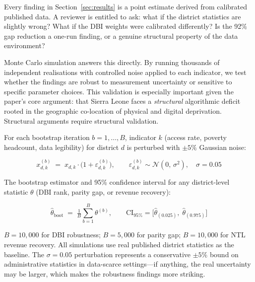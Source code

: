 \documentclass[preprint,12pt]{elsarticle}
\begin{document}
Every finding in Section~\ref{sec:results} is a point estimate
derived from calibrated published data. A reviewer is entitled
to ask: what if the district statistics are slightly wrong?
What if the DBI weights were calibrated differently? Is the
92\% gap reduction a one-run finding, or a genuine structural
property of the data environment?

Monte Carlo simulation answers this directly. By running
thousands of independent realisations with controlled noise
applied to each indicator, we test whether the findings are
robust to measurement uncertainty or sensitive to specific
parameter choices. This validation is especially important
given the paper's core argument: that Sierra Leone faces a
\textit{structural} algorithmic deficit rooted in the
geographic co-location of physical and digital deprivation.
Structural arguments require structural validation.

\begin{tcolorbox}[metMC,
  title={Monte Carlo Bootstrap Estimator}]

For each bootstrap iteration $b = 1, \ldots, B$, indicator
$k$ (access rate, poverty headcount, data legibility) for
district $d$ is perturbed with $\pm 5\%$ Gaussian noise:

\begin{equation}
x_{d,k}^{(b)} \;=\; x_{d,k}\cdot
\bigl(1 + \varepsilon_{d,k}^{(b)}\bigr),
\qquad
\varepsilon_{d,k}^{(b)} \sim \mathcal{N}(0,\,\sigma^2),
\quad \sigma = 0.05
\label{eq:bootstrap}
\end{equation}

The bootstrap estimator and 95\% confidence interval for
any district-level statistic $\theta$ (DBI rank, parity gap,
or revenue recovery):

\begin{equation}
\hat\theta_{\mathrm{boot}} \;=\;
\tfrac{1}{B}\sum_{b=1}^{B}\theta^{(b)},
\qquad
\mathrm{CI}_{95\%} =
\bigl[\hat\theta_{(0.025)},\;\hat\theta_{(0.975)}\bigr]
\label{eq:bootci}
\end{equation}

$B = 10{,}000$ for DBI robustness; $B = 5{,}000$ for parity
gap; $B = 10{,}000$ for NTL revenue recovery. All simulations
use real published district statistics as the baseline.
The $\sigma = 0.05$ perturbation represents a conservative
$\pm 5\%$ bound on administrative statistics in data-scarce
settings---if anything, the real uncertainty may be larger,
which makes the robustness findings more striking.

\end{tcolorbox}
\end{document}
